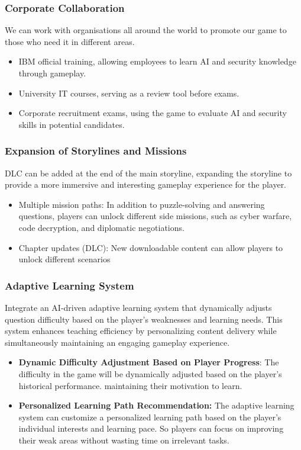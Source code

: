 \documentclass[11pt, a4paper]{article}
\begin{document}
\subsubsection{Corporate Collaboration}
\noindent We can work with organisations all around the world to promote our game to those who need it in different areas.

\begin{itemize}
    \item IBM official training, allowing employees to learn AI and security knowledge through gameplay.
    \item University IT courses, serving as a review tool before exams.
    \item Corporate recruitment exams, using the game to evaluate AI and security skills in potential candidates.
\end{itemize}

\subsubsection{Expansion of Storylines and Missions}
\noindent DLC can be added at the end of the main storyline, expanding the storyline to provide a more immersive and interesting gameplay experience for the player.
\begin{itemize}
    \item Multiple mission paths: In addition to puzzle-solving and answering questions, players can unlock different side missions, such as cyber warfare, code decryption, and diplomatic negotiations.
    \item Chapter updates (DLC): New downloadable content can allow players to unlock different scenarios
\end{itemize}

\subsubsection{Adaptive Learning System}
\noindent Integrate an AI-driven adaptive learning system that dynamically adjusts question difficulty based on the player's weaknesses and learning needs. This system enhances teaching efficiency by personalizing content delivery while simultaneously maintaining an engaging gameplay experience.
\begin{itemize}
    \item \textbf{Dynamic Difficulty Adjustment Based on Player Progress}: The difficulty in the game will be dynamically adjusted based on the player's historical performance.  maintaining their motivation to learn.
    \item \textbf{Personalized Learning Path Recommendation:} The adaptive learning system can customize a personalized learning path based on the player's individual interests and learning pace. So players can focus on improving their weak areas without wasting time on irrelevant tasks.
\end{itemize}
\end{document}

